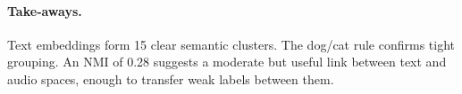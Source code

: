 \documentclass{article}
\begin{document}
\paragraph{Take‑aways.} Text embeddings form 15 clear semantic clusters. The dog/cat rule confirms tight grouping. An NMI of 0.28 suggests a moderate but useful link between text and audio spaces, enough to transfer weak labels between them.

\end{document}
